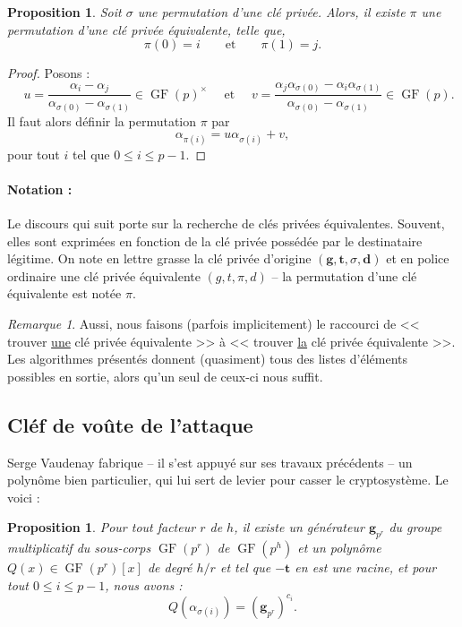 \documentclass[a4paper, titlepage, 11pt]{article}
\newtheorem{prop}[theo]{Proposition}
\theoremstyle{definition}
\theoremstyle{remark}
\newtheorem{rema}[theo]{Remarque}
\def\gf{\operatorname{GF}}
\def\mbf#1{\mathbf{#1}}
\begin{document}
\begin{prop}\label{prop:permutation}
Soit $\sigma$ une permutation d'une clé privée. Alors, il existe $\pi$ une permutation d'une clé privée équivalente, telle que, $$\pi(0) = i \qquad \text{et}\qquad \pi(1) = j.$$
\end{prop}

\begin{proof}
Posons :
$$\quad u = \frac{\alpha_i - \alpha_j}{\alpha_{\sigma(0)}- \alpha_{\sigma(1)}} \in \gf(p)^\times \quad \text{ et } \quad v =  \frac{\alpha_j\alpha_{\sigma(0)} - \alpha_i\alpha_{\sigma(1)}}{\alpha_{\sigma(0)}- \alpha_{\sigma(1)}} \in \gf(p).$$
Il faut alors définir la permutation $\pi$ par
 $$\alpha_{\pi(i)} = u\alpha_{\sigma(i)} + v,$$
 pour tout $i$ tel que $0 \leqslant i \leqslant p-1$.
\end{proof}

\paragraph*{Notation :} Le discours qui suit porte sur la recherche de clés privées équivalentes. Souvent, elles sont exprimées en fonction de la clé privée possédée par le destinataire légitime. On note en lettre grasse la clé privée d'origine $(\mbf{g}, \mbf{t}, \sigma, \mbf{d})$ et en police ordinaire une clé privée équivalente $(g, t, \pi, d)$ -- la permutation d'une clé équivalente est notée $\pi$.

\begin{rema}
Aussi, nous faisons (parfois implicitement) le raccourci de << trouver \underline{une} clé privée équivalente >> à << trouver \underline{la} clé privée équivalente >>. Les algorithmes présentés donnent (quasiment) tous des listes d'éléments possibles en sortie, alors qu'un seul de ceux-ci nous suffit.
\end{rema}

\subsection*{Cléf de voûte de l'attaque}

Serge Vaudenay fabrique -- il s'est appuyé sur ses travaux précédents -- un polynôme bien particulier, qui lui sert de levier pour casser le cryptosystème. Le voici :

\begin{prop}\label{premierePropVaudenay}
Pour tout facteur $r$ de $h$, il existe un générateur $\mbf g_{p^r}$ du groupe multiplicatif du sous-corps $\gf(p^r)$ de $\gf(p^h)$ et un polynôme $Q(x) \in \gf(p^r)[x]$ de degré $h/r$ et tel que $-\mbf t$ en est une racine, et pour tout $0\leqslant i \leqslant p-1$, nous avons :
$$Q\left(\alpha_{\sigma(i)}\right) = (\mbf g_{p^r})^{c_i}.$$
\end{prop}
\end{document}
